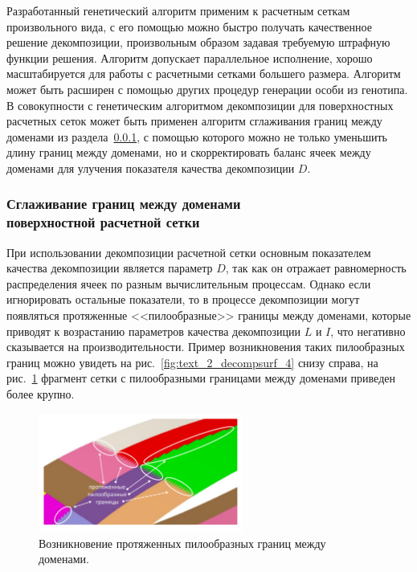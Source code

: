 Разработанный генетический алгоритм применим к расчетным сеткам произвольного вида, с его помощью можно быстро получать качественное решение декомпозиции, произвольным образом задавая требуемую штрафную функции решения.
Алгоритм допускает параллельное исполнение, хорошо масштабируется для работы с расчетными сетками большего размера.
Алгоритм может быть расширен с помощью других процедур генерации особи из генотипа.
В совокупности с генетическим алгоритмом декомпозиции для поверхностных расчетных сеток\label{term:unstruct_surf_calc_mesh5} может быть применен алгоритм сглаживания границ между доменами\label{term:alg_smooth_domains_border2} из раздела~\ref{sec:text_2_smooth}, с помощью которого можно не только уменьшить длину границ между доменами, но и скорректировать баланс ячеек между доменами для улучения показателя качества декомпозиции $D$.\label{term:decomp_neravn7}

\subsubsection{Сглаживание границ между доменами \\ поверхностной расчетной сетки}\label{sec:text_2_smooth}

При использовании декомпозиции расчетной сетки основным показателем качества декомпозиции является параметр $D$\label{term:decomp_neravn5}, так как он отражает равномерность распределения ячеек по разным вычислительным процессам.
Однако если игнорировать остальные показатели, то в процессе декомпозиции могут появляться протяженные <<пилообразные>> границы между доменами\label{term:domain3}, которые приводят к возрастанию параметров качества декомпозиции $L$\label{term:decomp_maxbord4} и $I$\label{term:decomp_sumbord4}, что негативно сказывается на производительности.
Пример возникновения таких пилообразных границ можно увидеть на рис.~\ref{fig:text_2_decompsurf_4} снизу справа, на рис.~\ref{fig:text_2_smooth_bad_border} фрагмент сетки с пилообразными границами между доменами приведен более крупно.

\begin{figure}[ht]
\centering
\includegraphics[width=0.6\textwidth]{./pics/text_2_smooth/bad-border.pdf}
\singlespacing
{}\caption{Возникновение протяженных пилообразных границ между доменами.}
\label{fig:text_2_smooth_bad_border}
\end{figure}

